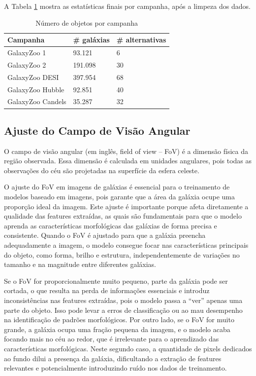 A Tabela \ref{tab:gz} mostra as estatísticas finais por campanha, após a limpeza dos dados.

\begin{table}[htbp]
  \centering
  \caption{Número de objetos por campanha}
  \label{tab:gz}
  \begin{tabular}{lll}\toprule
    Campanha          & \# galáxias & \# alternativas \\\hline
    GalaxyZoo 1       & 93.121      & 6               \\
    GalaxyZoo 2       & 191.098     & 30              \\
    GalaxyZoo DESI    & 397.954     & 68              \\
    GalaxyZoo Hubble  & 92.851      & 40              \\
    GalaxyZoo Candels & 35.287      & 32              \\
    \bottomrule
  \end{tabular}
\end{table}



\subsection{Ajuste do Campo de Visão Angular}
\label{sec:aquisicao-fov}

O campo de visão angular (em inglês, field of view -- FoV) é a dimensão física da região observada. Essa dimensão é calculada em unidades angulares, pois todas as observações do céu são projetadas na superfície da esfera celeste.

O ajuste do FoV em imagens de galáxias é essencial para o treinamento de modelos baseado em imagens, pois garante que a área da galáxia ocupe uma proporção ideal da imagem. Este ajuste é importante porque afeta diretamente a qualidade das features extraídas, as quais são fundamentais para que o modelo aprenda as características morfológicas das galáxias de forma precisa e consistente. Quando o FoV é ajustado para que a galáxia preencha adequadamente a imagem, o modelo consegue focar nas características principais do objeto, como forma, brilho e estrutura, independentemente de variações no tamanho e na magnitude entre diferentes galáxias.

Se o FoV for proporcionalmente muito pequeno, parte da galáxia pode ser cortada, o que resulta na perda de informações essenciais e introduz inconsistências nas features extraídas, pois o modelo passa a ``ver'' apenas uma parte do objeto. Isso pode levar a erros de classificação ou ao mau desempenho na identificação de padrões morfológicos. Por outro lado, se o FoV for muito grande, a galáxia ocupa uma fração pequena da imagem, e o modelo acaba focando mais no céu ao redor, que é irrelevante para o aprendizado das características morfológicas. Neste segundo caso, a quantidade de pixels dedicados ao fundo dilui a presença da galáxia, dificultando a extração de features relevantes e potencialmente introduzindo ruído nos dados de treinamento.

